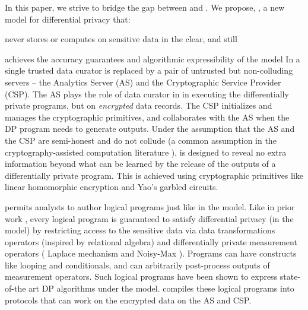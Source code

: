 In this paper, we strive to bridge the gap between \ldp and \cdp. We propose, \system, a new model for differential privacy that: 
\squishlist
\item never stores or computes on sensitive data in the clear, and still
\item achieves the accuracy guarantees and algorithmic expressibility of the \cdp model \squishend 
In \system a single trusted data curator is replaced by a pair of untrusted but non-colluding servers -- the Analytics Server (\textsf{AS}) and the Cryptographic Service Provider (\textsf{CSP}). The \textsf{AS} plays the role of  data curator in \cdp in executing the differentially private programs, but on \textit{encrypted} data records. The \textsf{CSP} initializes and manages the cryptographic primitives, and collaborates with the \textsf{AS} when the DP program needs to generate outputs. Under the assumption that the \textsf{AS} and the \textsf{CSP} are semi-honest and do not collude (a common assumption in the cryptography-assisted computation literature \cite{Boneh1,Boneh2,Ridge2,Matrix2,secureML,LReg,Ver}), \system is designed to reveal no extra information beyond what can be learned by the release of the outputs of a differentially private program. This is achieved using cryptographic primitives like linear homomorphic encryption and Yao's garbled circuits. 

\system permits analysts to author logical programs just like in the \cdp model. Like in prior work \cite{PINQ, FWPINQ, ektelo}, every logical program is guaranteed to satisfy differential privacy (in the \cdp model) by restricting access to the sensitive data via data transformations operators (inspired by relational algebra) and differentially private measurement operators ( Laplace mechanism and Noisy-Max \cite{Dork}). Programs can have constructs like looping and conditionals, and can arbitrarily post-process outputs of measurement operators. Such logical programs have been shown to express state-of-the art DP algorithms under the \cdp model. \system compiles these logical programs into \system protocols that can work on the encrypted data on the \textsf{AS} and \textsf{CSP}. 


